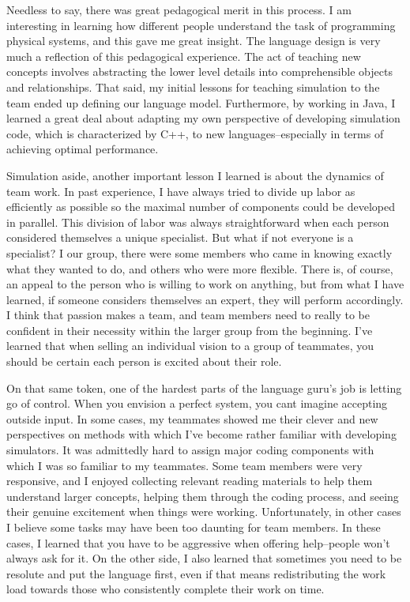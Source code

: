 \begin{description}
  Needless to say, there was great pedagogical merit in this
  process. I am interesting in learning how different people
  understand the task of programming physical systems, and this gave
  me great insight. The language design is very much a reflection of
  this pedagogical experience. The act of teaching new concepts
  involves abstracting the lower level details into comprehensible
  objects and relationships. That said, my initial lessons for
  teaching simulation to the team ended up defining our language
  model. Furthermore, by working in Java, I learned a great deal about
  adapting my own perspective of developing simulation code, which is
  characterized by C++, to new languages--especially in terms of
  achieving optimal performance.

  Simulation aside, another important lesson I learned is about the
  dynamics of team work. In past experience, I have always tried to
  divide up labor as efficiently as possible so the maximal number of
  components could be developed in parallel. This division of labor
  was always straightforward when each person considered themselves a
  unique specialist. But what if not everyone is a specialist? I our
  group, there were some members who came in knowing exactly what they
  wanted to do, and others who were more flexible. There is, of
  course, an appeal to the person who is willing to work on anything,
  but from what I have learned, if someone considers themselves an
  expert, they will perform accordingly. I think that passion makes a
  team, and team members need to really to be confident in their
  necessity within the larger group from the beginning. I've learned
  that when selling an individual vision to a group of teammates, you
  should be certain each person is excited about their role.
	
  On that same token, one of the hardest parts of the language guru's
  job is letting go of control. When you envision a perfect system,
  you cant imagine accepting outside input. In some cases, my
  teammates showed me their clever and new perspectives on methods
  with which I've become rather familiar with developing
  simulators. It was admittedly hard to assign major coding components
  with which I was so familiar to my teammates. Some team members were
  very responsive, and I enjoyed collecting relevant reading materials
  to help them understand larger concepts, helping them through the
  coding process, and seeing their genuine excitement when things were
  working. Unfortunately, in other cases I believe some tasks may have
  been too daunting for team members. In these cases, I learned that
  you have to be aggressive when offering help--people won't always
  ask for it. On the other side, I also learned that sometimes you
  need to be resolute and put the language first, even if that means
  redistributing the work load towards those who consistently complete
  their work on time.


\end{description}
